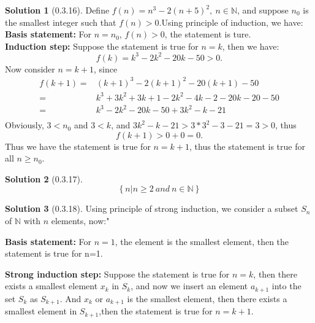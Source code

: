 \documentclass{article}
\theoremstyle{definition}
\newtheorem{sol}{Solution}[exe]
\begin{document}
\begin{sol}[0.3.16]

    Define $f(n)=n^{3}-2(n+5)^{2},\ n\in\mathbb{N}$, and suppose $n_{0}$ is the smallest integer such that $f(n)>0$.Using principle of induction, we have:
    \\\noindent\textbf{Basis statement:} For $n=n_{0}$, $f(n)>0$, the statement is ture.
    \\\noindent\textbf{Induction step:} Suppose the statement is true for $n=k$, then we have:
    $$f(k)=k^{3}-2k^{2}-20k-50>0.$$
    Now consider $n=k+1$, since
    \begin{align*}
        f(k+1)=&(k+1)^{3}-2(k+1)^{2}-20(k+1)-50\\
        =&k^{3}+3k^{2}+3k+1-2k^{2}-4k-2-20k-20-50\\
        =&k^{3}-2k^{2}-20k-50+3k^{2}-k-21\\
    \end{align*}
    Obviously, $3<n_{0}$ and $3<k$, and $3k^{2}-k-21>3*3^{2}-3-21=3>0$, thus
    $$f(k+1)>0+0=0.$$
    Thus we have the statement is true for $n=k+1$, thus the statement is true for all $n\geq n_{0}$. 
\end{sol}

\begin{sol}[0.3.17]
    $$\left\{n|n\geq 2\ and\ n\in\mathbb{N}\right\}$$
\end{sol}

\begin{sol}[0.3.18]
    Using principle of strong induction, we consider a subset $S_{n}$ of $\mathbb{N}$ with $n$ elements, now:"
    
    \noindent\textbf{Basis statement:} For $n=1$, the element is the smallest element, then the statement is true for n=1.

    \noindent\textbf{Strong induction step:} Suppose the statement is true for $n=k$, then there exists a smallest element $x_{k}$ in $S_{k}$, and now we insert an element $a_{k+1}$ into the set $S_{k}$ as $S_{k+1}$.
    And $x_{k}$ or $a_{k+1}$ is the smallest element, then there exists a smallest element in $S_{k+1}$,then the statement is true for $n=k+1$.

\end{sol}
\end{document}
